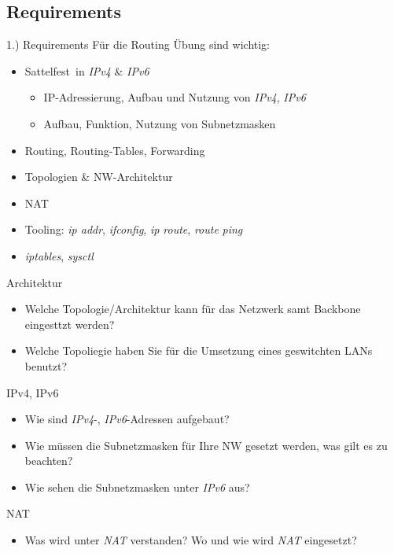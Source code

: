 \documentclass[xcolor=dvipsnames, aspectratio=169]{beamer}
\begin{document}
\subsection{Requirements}
\begin{frame}{1.) Requirements}
Für die Routing Übung sind wichtig:
\begin{itemize}
	\item \glqq Sattelfest\grqq\ in \emph{IPv4} \& \emph{IPv6}
	\begin{itemize}
		\item IP-Adressierung, Aufbau und Nutzung von \emph{IPv4}, \emph{IPv6}
		\item Aufbau, Funktion, Nutzung von Subnetzmasken	
	\end{itemize}
	\item Routing, Routing-Tables, Forwarding
	\item Topologien \& NW-Architektur
	\item NAT
	\item Tooling: \emph{ip addr}, \emph{ifconfig}, \emph{ip route}, \emph{route} \emph{ping}
	\item \emph{iptables}, \emph{sysctl}
\end{itemize}
\end{frame}

\begin{frame}{Architektur}
	\begin{itemize}
		\item Welche Topologie/Architektur kann für das Netzwerk samt Backbone eingesttzt werden?
		\item Welche Topoliegie haben Sie für die Umsetzung eines geswitchten LANs benutzt?
	\end{itemize}
\end{frame}

\begin{frame}{IPv4, IPv6}
	\begin{itemize}
		\item Wie sind \emph{IPv4}-, \emph{IPv6}-Adressen aufgebaut?
		\item Wie müssen die Subnetzmasken für Ihre NW gesetzt werden, was gilt es zu beachten?
		\item Wie sehen die Subnetzmasken unter \emph{IPv6} aus?
	\end{itemize}
\end{frame}

\begin{frame}{NAT}
	\begin{itemize}
		\item Was wird unter \emph{NAT} verstanden? Wo und wie wird \emph{NAT} eingesetzt?
	\end{itemize}
\end{frame}
\end{document}
